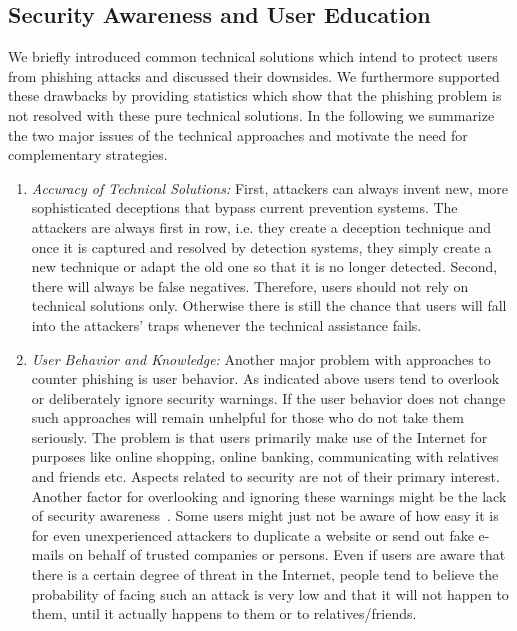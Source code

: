  \subsection{Security Awareness and User Education}
 \label{s:awareness}
We briefly introduced common technical solutions which intend to protect users from phishing attacks and discussed their downsides.
We furthermore supported these drawbacks by providing statistics which show that the phishing problem is not resolved with these pure technical solutions.
In the following we summarize the two major issues of the technical approaches and motivate the need for complementary strategies.
\begin{enumerate}
	\item\textit{Accuracy of Technical Solutions:} First, attackers can always invent new, more sophisticated deceptions that bypass current prevention systems.
	 The attackers are always first in row, i.e. they create a deception technique and once it is captured and resolved by detection systems, they simply create a new technique or adapt the old one so that it is no longer detected.
	 Second, there will always be false negatives.
Therefore, users should not rely on technical solutions only. 
Otherwise there is still the chance that users will fall into the attackers' traps whenever the technical assistance fails.
	\item\textit{User Behavior and Knowledge:} Another major problem with approaches to counter phishing is user behavior.
 As indicated above users tend to overlook or deliberately ignore security warnings.
 If the user behavior does not change such approaches will remain unhelpful for those who do not take them seriously.
 The problem is that users primarily make use of the Internet for purposes like online shopping, online banking, communicating with relatives and friends etc.
 Aspects related to security are not of their primary interest.
 Another factor for overlooking and ignoring these warnings might be the lack of security awareness~\cite{akhawe2013alice}.
 Some users might just not be aware of how easy it is for even unexperienced attackers to duplicate a website or send out fake e-mails on behalf of trusted companies or persons.
 Even if users are aware that there is a certain degree of threat in the Internet, people tend to believe the probability of facing such an attack is very low and that it will not happen to them, until it actually happens to them or to relatives/friends.
\end{enumerate}
